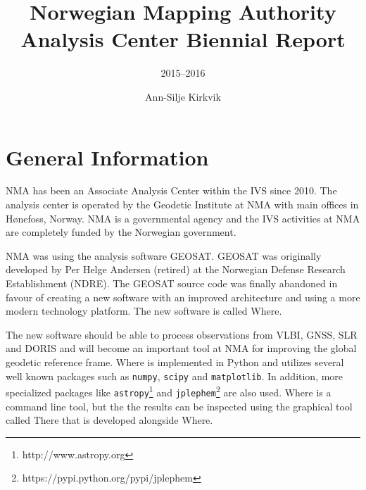 \documentclass[twocolumn,twoside]{svmultivs_br} %
\title*{Norwegian Mapping Authority Analysis Center Biennial Report}
\subtitle{2015--2016}
\author{Ann-Silje Kirkvik}
\institute{Norwegian Mapping Authority (NMA)}
\begin{document}
%
\maketitle       %
%
%
\section{General Information}
NMA has been an Associate Analysis Center within the IVS since 2010. The analysis center
is operated by the Geodetic Institute at NMA with main offices in H\o nefoss, Norway. NMA is a 
governmental agency and the IVS activities at NMA are completely funded by the Norwegian government.  

NMA was using the analysis software GEOSAT. GEOSAT was originally developed by Per Helge Andersen (retired) at the Norwegian 
Defense Research Establishment (NDRE). The GEOSAT source code was finally abandoned in favour of creating a new software
with an improved architecture and using a more modern technology platform. The new software is called Where. 

The new software should be able to process observations from VLBI, GNSS, SLR and DORIS and will become an important tool at
NMA for improving the global geodetic reference frame. Where is implemented in Python and utilizes several well known packages such as \texttt{numpy}, \texttt{scipy} and \texttt{matplotlib}. In addition, more specialized packages like \texttt{astropy}\footnote{http://www.astropy.org} and \texttt{jplephem}\footnote{https://pypi.python.org/pypi/jplephem} are also used. Where is a command line tool, but the the results can be inspected using the graphical tool called There that is developed alongside Where. 
\end{document}
